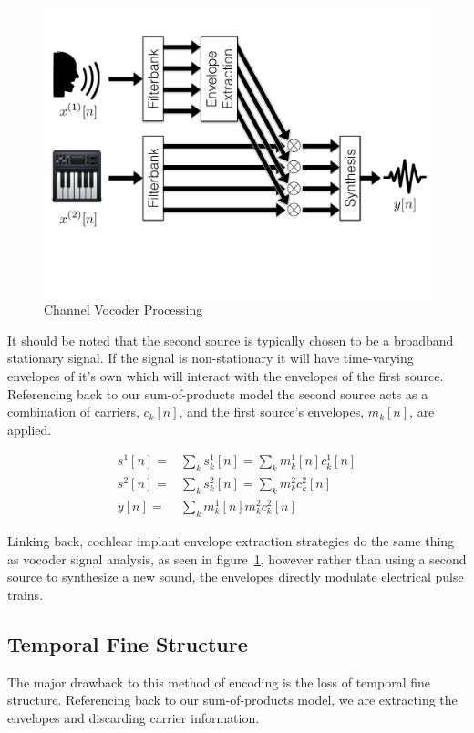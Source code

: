 \documentclass [11pt, proquest] {uwthesis}[2015/03/03]
\begin{document}
\begin{figure}[!ht]
  \centering
    \includegraphics[width=.75\textwidth]{vocoder}   
    \caption{Channel Vocoder Processing}\label{fig:vocoder}
\end{figure}

It should be noted that the second source is typically chosen to be a broadband stationary signal.  If the signal is non-stationary it will have time-varying envelopes of it's own which will interact with the envelopes of the first source. Referencing back to our sum-of-products model the second source acts as a combination of carriers, $c_k[n]$, and the first source's envelopes, $m_k[n]$, are applied.

\begin{align}
\label{eq:sum-of-products}
s^1[n] =& \sum\limits_k s_k^1[n] = \sum\limits_k m^1_k[n] c^1_k[n] \\
s^2[n] =& \sum\limits_k s_k^2[n] = \sum\limits_k m^2_k c^2_k[n] \\
y[n] =& \sum\limits_k m_k^1[n] m^2_k c^2_k[n]
\end{align}

Linking back, cochlear implant envelope extraction strategies do the same thing as vocoder signal analysis, as seen in figure~\ref{fig:vocoder}, however rather than using a second source to synthesize a new sound, the envelopes directly modulate electrical pulse trains.

\subsection{Temporal Fine Structure}

The major drawback to this method of encoding is the loss of temporal fine structure.  Referencing back to our sum-of-products model, we are extracting the envelopes and discarding carrier information.
\end{document}
